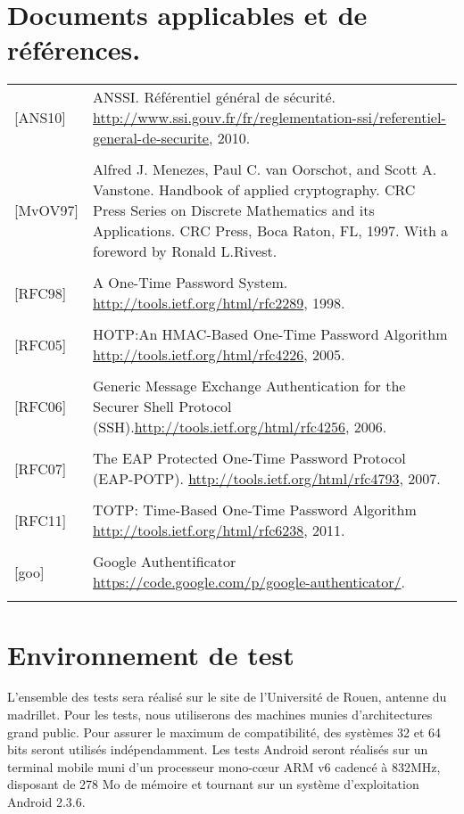 \documentclass{"../../res/univ-projet"}
\begin{document}
  \section{Documents applicables et de références.}
  \begin{tabular}{p{}>{\raggedright\arraybackslash}p{13cm}}
    {[ANS10]} & {ANSSI. Référentiel général de sécurité. \href{http://www.ssi.gouv.fr/fr/reglementation-ssi/referentiel-general-de-securite}{http://www.ssi.gouv.fr/fr/reglementation-ssi/referentiel-general-de-securite}, 2010.}
    \tabularnewline
    \\
    {[MvOV97]} & {Alfred J. Menezes, Paul C. van Oorschot, and Scott A. Vanstone. Handbook of applied cryptography. CRC Press Series on Discrete Mathematics and its Applications. CRC Press, Boca Raton, FL, 1997. With a foreword by Ronald L.Rivest.}
    \tabularnewline
    \\
    {[RFC98]} & {A One-Time Password System. \href{http://tools.ietf.org/html/rfc2289}{http://tools.ietf.org/html/rfc2289}, 1998.}
    \tabularnewline
    \\
    {[RFC05]} & {HOTP:An HMAC-Based One-Time Password Algorithm \href{http://tools.ietf.org/html/rfc4226}{http://tools.ietf.org/html/rfc4226}, 2005.}
    \tabularnewline
    \\
    {[RFC06]} & {Generic Message Exchange Authentication for the Securer Shell Protocol (SSH).\href{http://tools.ietf.org/html/rfc4256}{http://tools.ietf.org/html/rfc4256}, 2006.}
    \tabularnewline
    \\
    {[RFC07]} & {The EAP Protected One-Time Password Protocol (EAP-POTP). \href{http://tools.ietf.org/html/rfc4793}{http://tools.ietf.org/html/rfc4793}, 2007.}
    \tabularnewline
    \\
    {[RFC11]} & {TOTP: Time-Based One-Time Password Algorithm \href{http://tools.ietf.org/html/rfc6238}{http://tools.ietf.org/html/rfc6238}, 2011.}
    \tabularnewline
    \\
    {[goo]} & {Google Authentificator \href{https://code.google.com/p/google-authenticator/}{https://code.google.com/p/google-authenticator/}.}
    \tabularnewline
    \\
  \end{tabular}
  
  \section{Environnement de test}
  L'ensemble des tests sera réalisé sur le site de l'Université de Rouen, antenne du madrillet.
  Pour les tests, nous utiliserons des machines munies d'architectures grand public. Pour assurer le maximum de compatibilité, des systèmes 32 et 64 bits seront utilisés 
  indépendamment. Les tests Android seront réalisés sur un terminal mobile muni d'un processeur mono-cœur ARM v6 cadencé à 832MHz, disposant de 278 Mo de mémoire et tournant sur un 
  système d'exploitation Android 2.3.6.
  
\end{document}
